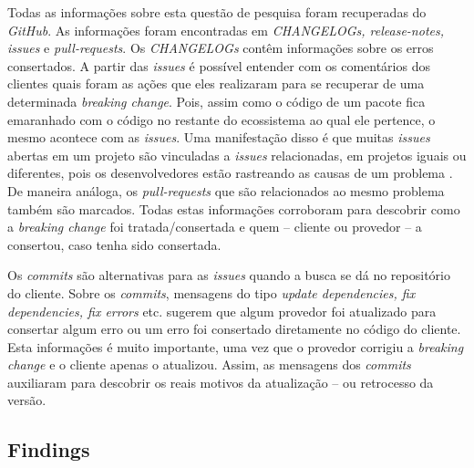 Todas as informações sobre esta questão de pesquisa foram recuperadas do \textit{GitHub}. As informações foram encontradas em \textit{CHANGELOGs, release-notes, issues} e \textit{pull-requests}. Os \textit{CHANGELOGs} contêm informações sobre os erros consertados. A partir das \textit{issues} é possível entender com os comentários dos clientes quais foram as ações que eles realizaram para se recuperar de uma determinada \textit{breaking change}. Pois, assim como o código de um pacote fica emaranhado com o código no restante do ecossistema ao qual ele pertence, o mesmo acontece com as \textit{issues}. Uma manifestação disso é que muitas \textit{issues} abertas em um projeto são vinculadas a \textit{issues} relacionadas, em projetos iguais ou diferentes, pois os desenvolvedores estão rastreando as causas de um problema \cite{Zhang:2018:WIL:3242887.3242891}. De maneira análoga, os \textit{pull-requests} que são relacionados ao mesmo problema também são marcados. Todas estas informações corroboram para descobrir como a \textit{breaking change} foi tratada/consertada e quem -- cliente ou provedor -- a consertou, caso tenha sido consertada.

Os \textit{commits} são alternativas para as \textit{issues} quando a busca se dá no repositório do cliente. Sobre os \textit{commits}, mensagens do tipo \textit{update dependencies, fix dependencies, fix errors} etc. sugerem que algum provedor foi atualizado para consertar algum erro ou um erro foi consertado diretamente no código do cliente. Esta informações é muito importante, uma vez que o provedor corrigiu a \textit{breaking change} e o cliente apenas o atualizou. Assim, as mensagens dos \textit{commits} auxiliaram para descobrir os reais motivos da atualização -- ou retrocesso da versão.

\subsection{Findings}
\label{d_fin:rq3}
